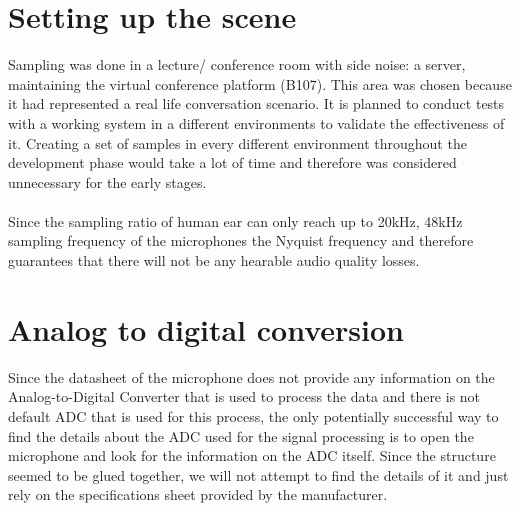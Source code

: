 \section{Setting up the scene}
Sampling was done in a lecture/ conference room with side noise: a server, maintaining the virtual conference platform (B107). This area was chosen because it had represented a real life conversation scenario. It is planned to conduct tests with a working system in a different environments to validate the effectiveness of it. Creating a set of samples in every different environment throughout the development phase would take a lot of time and therefore was considered unnecessary for the early stages. 
\paragraph{}
Since the sampling ratio of human ear can only reach up to 20kHz, 48kHz sampling frequency of the microphones the Nyquist frequency and therefore guarantees that there will not be any hearable audio quality losses.   
\section{Analog to digital conversion}
Since the datasheet of the microphone does not provide any information on the Analog-to-Digital Converter that is used to process the data and there is not default ADC that is used for this process, the only potentially successful way to find the details about the ADC used for the signal processing is to open the microphone and look for the information on the ADC itself. Since the structure seemed to be glued together, we will not attempt to find the details of it and just rely on the specifications sheet provided by the manufacturer.  

 

